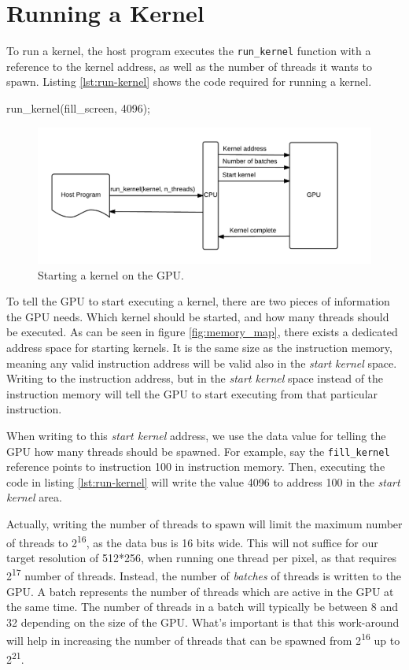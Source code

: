 \section{Running a Kernel}
To run a kernel, the host program executes the \verb/run_kernel/ function with a reference to the kernel address, as well as the number of threads it wants to spawn.
Listing \ref{lst:run-kernel} shows the code required for running a kernel.

\begin{c-code}[caption=Running a kernel, label=lst:run-kernel]
run_kernel(fill_screen, 4096);
\end{c-code}

\begin{figure}[H]
    \centering
    \includegraphics[width=\textwidth]{../cpu/diagrams/running_a_kernel.png}
    \caption{Starting a kernel on the GPU.}
    \label{fig:running_a_kernel}
\end{figure}

To tell the GPU to start executing a kernel,
there are two pieces of information the GPU needs.
Which kernel should be started, and how many threads should be executed.
As can be seen in figure \ref{fig:memory_map}, there exists a dedicated address space for starting kernels.
It is the same size as the instruction memory,
meaning any valid instruction address will be valid also in the \emph{start kernel} space.
Writing to the instruction address,
but in the \emph{start kernel} space instead of the instruction memory will tell the GPU to start executing from that particular instruction.

When writing to this \emph{start kernel} address, we use the data value for telling the GPU how many threads should be spawned.
For example, say the \verb/fill_kernel/ reference points to instruction 100 in instruction memory.
Then, executing the code in listing \ref{lst:run-kernel} will write the value 4096 to address 100 in the \emph{start kernel} area.

Actually, writing the number of threads to spawn
will limit the maximum number of threads to 2\textsuperscript{16}, as the data bus is 16 bits wide.
This will not suffice for our target resolution of 512*256, when running one thread per pixel, as that requires 2\textsuperscript{17} number of threads.
Instead, the number of \emph{batches} of threads is written to the GPU.
A batch represents the number of threads which are active in the GPU at the same time.
The number of threads in a batch will typically be between 8 and 32 depending on the size of the GPU.
What's important is that this work-around will help in increasing the number of threads that can be spawned from 2\textsuperscript{16} up to 2\textsuperscript{21}.

